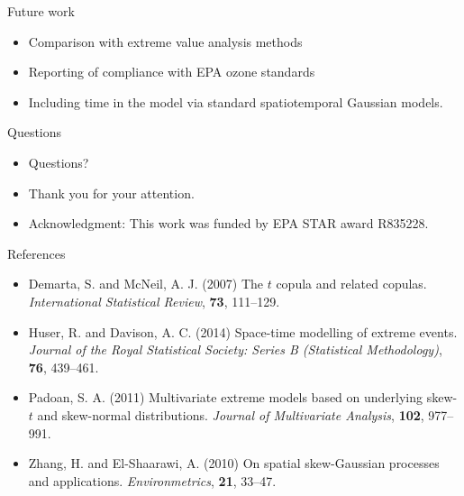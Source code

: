 \documentclass{beamer}
\begin{document}
\begin{frame}{Future work}
  \begin{itemize} \setlength{\itemsep}{0.5em}
    \item Comparison with extreme value analysis methods
    \item Reporting of compliance with EPA ozone standards
    \item Including time in the model via standard spatiotemporal Gaussian models.
  \end{itemize}
\end{frame}

\begin{frame}{Questions}
  \begin{itemize} \setlength{\itemsep}{0.5em}
    \item Questions?
    \item Thank you for your attention.
    \item Acknowledgment: This work was funded by EPA STAR award R835228.
  \end{itemize}
\end{frame}

\begin{frame}{References}
  \begin{itemize} \setlength{\itemsep}{0.5em}
    \item Demarta, S. and McNeil, A. J. (2007) The $t$ copula and related copulas. {\it International Statistical Review}, {\bf 73}, 111--129.
    \item Huser, R. and Davison, A. C. (2014) Space-time modelling of extreme events. {\it Journal of the Royal Statistical Society: Series B (Statistical Methodology)}, {\bf 76}, 439--461.
    \item Padoan, S. A. (2011) Multivariate extreme models based on underlying skew-$t$ and skew-normal distributions. {\it Journal of Multivariate Analysis}, {\bf 102}, 977--991.
    \item Zhang, H. and El-Shaarawi, A. (2010) On spatial skew-Gaussian processes and applications. {\it Environmetrics}, {\bf 21}, 33--47.
  \end{itemize}
\end{frame}
\end{document}
